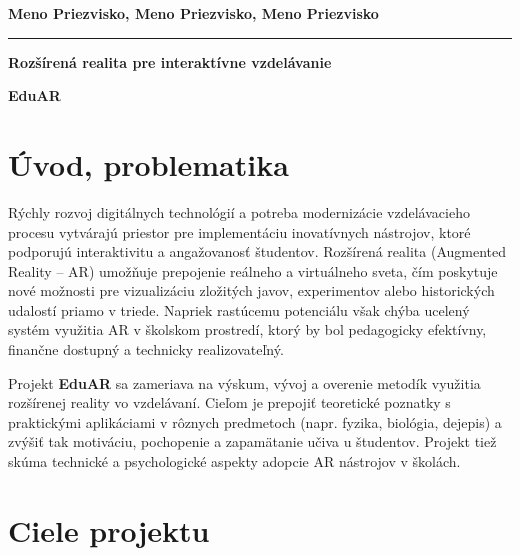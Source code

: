\documentclass[a4paper,24pt]{article}
\begin{document}
\begin{center}
    \Large \textbf{Meno Priezvisko, Meno Priezvisko, Meno Priezvisko}
\end{center}

\noindent\rule{\textwidth}{0.4pt} %

\vspace{1em}

\begin{center}
    \LARGE \textbf{Rozšírená realita pre interaktívne vzdelávanie}
\end{center}

\vspace{0.5em}

\begin{center}
    \large \textbf{EduAR}
\end{center}

\vspace{1em}

\section{Úvod, problematika}

Rýchly rozvoj digitálnych technológií a potreba modernizácie vzdelávacieho procesu vytvárajú priestor pre implementáciu inovatívnych nástrojov, ktoré podporujú interaktivitu a angažovanosť študentov. Rozšírená realita (Augmented Reality – AR) umožňuje prepojenie reálneho a virtuálneho sveta, čím poskytuje nové možnosti pre vizualizáciu zložitých javov, experimentov alebo historických udalostí priamo v triede. Napriek rastúcemu potenciálu však chýba ucelený systém využitia AR v školskom prostredí, ktorý by bol pedagogicky efektívny, finančne dostupný a technicky realizovateľný.

Projekt \textbf{EduAR} sa zameriava na výskum, vývoj a overenie metodík využitia rozšírenej reality vo vzdelávaní. Cieľom je prepojiť teoretické poznatky s praktickými aplikáciami v rôznych predmetoch (napr. fyzika, biológia, dejepis) a zvýšiť tak motiváciu, pochopenie a zapamätanie učiva u študentov. Projekt tiež skúma technické a psychologické aspekty adopcie AR nástrojov v školách.

\vspace{2em}
\section{Ciele projektu}
\end{document}
